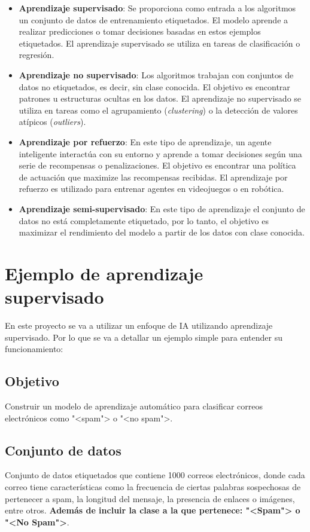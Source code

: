 \begin{itemize}
\item \textbf{Aprendizaje supervisado}: Se proporciona como entrada a los algoritmos un conjunto de datos de entrenamiento etiquetados. El modelo aprende a realizar predicciones o tomar decisiones basadas en estos ejemplos etiquetados. El aprendizaje supervisado se utiliza en tareas de clasificación o regresión.

\item \textbf{Aprendizaje no supervisado}: Los algoritmos trabajan con conjuntos de datos no etiquetados, es decir, sin clase conocida. El objetivo es encontrar patrones u estructuras ocultas en los datos. El aprendizaje no supervisado se utiliza en tareas como el agrupamiento (\textit{clustering}) o la detección de valores atípicos (\emph{outliers}).

\item \textbf{Aprendizaje por refuerzo}: En este tipo de aprendizaje, un agente inteligente interactúa con su entorno y aprende a tomar decisiones según una serie de recompensas o penalizaciones. El objetivo es encontrar una política de actuación que maximize las recompensas recibidas. El aprendizaje por refuerzo es utilizado para entrenar agentes en videojuegos o en robótica.

\item \textbf{Aprendizaje semi-supervisado}: En este tipo de aprendizaje el conjunto de datos no está completamente etiquetado, por lo tanto, el objetivo es maximizar el rendimiento del modelo a partir de los datos con clase conocida.
\end{itemize}

\section{Ejemplo de aprendizaje supervisado}

En este proyecto se va a utilizar un enfoque de IA utilizando aprendizaje supervisado. Por lo que se va a detallar un ejemplo simple para entender su funcionamiento:

\subsection{Objetivo}
Construir un modelo de aprendizaje automático para clasificar correos electrónicos como "<spam"> o "<no spam">.

\subsection{Conjunto de datos}
Conjunto de datos etiquetados que contiene 1000 correos electrónicos, donde cada correo tiene características como la frecuencia de ciertas palabras sospechosas de pertenecer a spam, la longitud del mensaje, la presencia de enlaces o imágenes, entre otros. \textbf{Además de incluir la clase a la que pertenece: "<Spam"> o "<No Spam">}.

